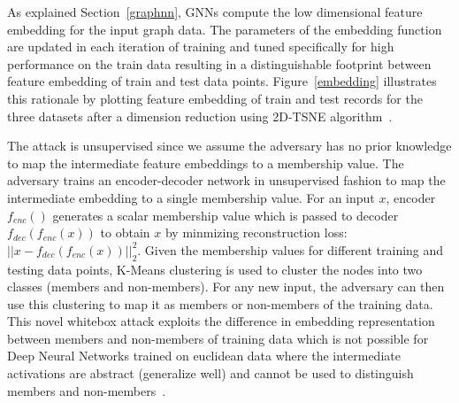 As explained Section~\ref{graphnn}, GNNs compute the low dimensional feature embedding for the input graph data.
The parameters of the embedding function are updated in each iteration of training and tuned specifically for high performance on the train data resulting in a distinguishable footprint between feature embedding of train and test data points.
Figure~\ref{embedding} illustrates this rationale by plotting feature embedding of train and test records for the three datasets after a dimension reduction using 2D-TSNE algorithm~\cite{vanDerMaaten2008}.



The attack is unsupervised since we assume the adversary has no prior knowledge to map the intermediate feature embeddings to a membership value. %
The adversary trains an encoder-decoder network in unsupervised fashion to map the intermediate embedding to a single membership value.
For an input $x$, encoder $f_{enc}()$ generates a scalar membership value which is passed to decoder $f_{dec}(f_{enc}(x))$ to obtain $x$ by minmizing reconstruction loss: $||x - f_{dec}(f_{enc}(x))||_2^2$.
Given the membership values for different training and testing data points, K-Means clustering is used to cluster the nodes into two classes (members and non-members).
For any new input, the adversary can then use this clustering to map it as members or non-members of the training data.
This novel whitebox attack exploits the difference in embedding representation between members and non-members of training data which is not possible for Deep Neural Networks trained on euclidean data where the intermediate activations are abstract (generalize well) and cannot be used to distinguish members and non-members~\cite{8835245}.
